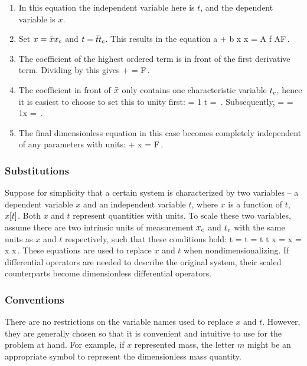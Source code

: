 \begin{solution}
\begin{enumerate}
\item In this equation the independent variable here is $t$, and the dependent variable is $x$.
%
\item Set $x = \bar{x} {x}_{c}$ and $t = \bar{t} {t}_{c}$. This results in the equation
\beq
a + b \chpq x \scpq x = A f  AF\,.
\eeq
%
\item The coefficient of the highest ordered term is in front of the first derivative term. Dividing by this gives
\beq
{} +  = F\,.
\eeq
%
\item The coefficient in front of $\bar{x}$ only contains one characteristic variable ${t}_{c}$, hence it is easiest to choose to set this to unity first:
\beq
{} = 1 \implies \chpq t = \,.
\eeq
Subsequently, 
\beq
{} =  = 1\implies \chpq x = \,.
\eeq
%
\item The final dimensionless equation in this case becomes completely independent of any parameters with units:
\beq
{} + \scpq x = F\,.
\eeq
\end{enumerate}
\end{solution}


\subsubsection{Substitutions}
Suppose for simplicity that a certain system is characterized by two variables -- a dependent variable $x$ and an independent variable $t$, where $x$ is a function of $t$, $x\!\left[{t}\right]$. Both $x$ and $t$ represent quantities with units. To scale these two variables, assume there are two intrinsic units of measurement ${x}_{c}$ and ${t}_{c}$ with the same units as $x$ and $t$ respectively, such that these conditions hold:
\beq
\scpq t = \implies t = \scpq t \chpq t\qquad{}\qquad 
\scpq x = \implies x = \scpq x \chpq x\,.
\eeq
These equations are used to replace $x$ and $t$ when nondimensionalizing. If differential operators are needed to describe the original system, their scaled counterparts become dimensionless differential operators.


\subsubsection{Conventions}
There are no restrictions on the variable names used to replace $x$ and $t$. However, they are generally chosen so that it is convenient and intuitive to use for the problem at hand. For example, if $x$ represented mass, the letter $m$ might be an appropriate symbol to represent the dimensionless mass quantity.

